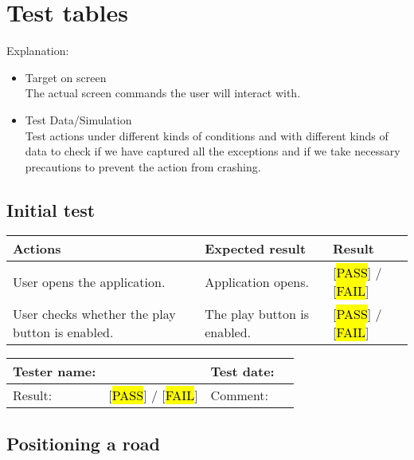 \newcommand{\pass}{[\sethlcolor{green}\hl{PASS}] / [\sethlcolor{red}\hl{FAIL}]}
\section{Test tables}
Explanation: 
\begin{itemize}
	\item Target on screen\\
	The actual screen commands the user will interact with.
	\item Test Data/Simulation\\
	Test actions under different kinds of conditions and with different kinds of data to check if we have captured all the exceptions and if we take necessary precautions to prevent the action from crashing.
	
\end{itemize}
\newpage
\subsection{Initial test}
	\begin{tabularx}{\textwidth}{|X|X|p{2.5cm}|}\hline
		Actions & Expected result & Result \\\hline
		User opens the application.& Application opens. &  \pass \\\hline
		User checks whether the play button is enabled. & The play button is enabled. &  \pass \\\hline
	\end{tabularx}
	
	\begin{tabularx}{\textwidth}{|p{3cm}X|p{3cm}X|}\hline
		Tester name: &  & Test date: & \\\hline
		Result: &  \pass  & Comment: & \\\hline
	\end{tabularx}
	
\newpage

\subsection{Positioning a road}

